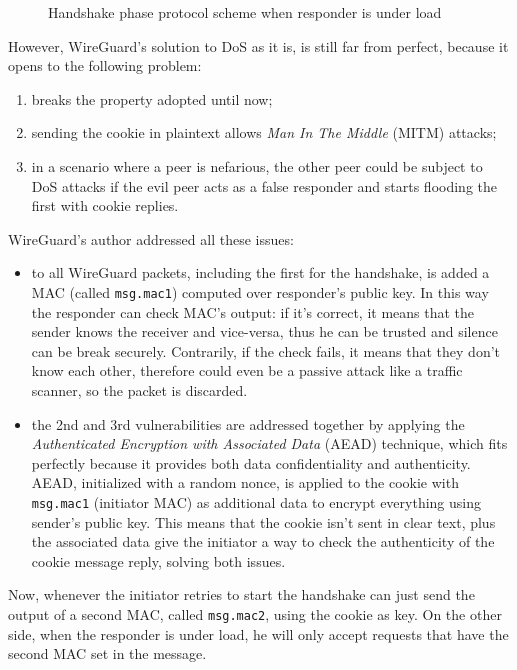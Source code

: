 \documentclass[light]{academica}
\begin{document}
\begin{figure}
  \centering
  
  \caption{Handshake phase protocol scheme when responder is under load}
  \label{fig:handshakeschemeunderload}
\end{figure}

\newpage

However, WireGuard's solution to DoS as it is, is still far from perfect, because it opens to the following problem:
\begin{enumerate}
  \item breaks the  property adopted until now;
  \item sending the cookie in plaintext allows \textit{Man In The Middle} (MITM) attacks;
  \item in a scenario where a peer is nefarious, the other peer could be subject to DoS attacks if the evil peer acts as a false responder and starts flooding the first with cookie replies.
\end{enumerate}
WireGuard's author addressed all these issues:
\begin{itemize}
  \item to all WireGuard packets, including the first for the handshake, is added a MAC (called \texttt{msg.mac1}) computed over responder's public key. In this way the responder can check MAC's output: if it's correct, it means that the sender knows the receiver and vice-versa, thus he can be trusted and silence can be break securely. Contrarily, if the check fails, it means that they don't know each other, therefore could even be a passive attack like a traffic scanner, so the packet is discarded.
  \item the 2nd and 3rd vulnerabilities are addressed together by applying the \textit{Authenticated Encryption with Associated Data} (AEAD) technique, which fits perfectly because it provides both data confidentiality and authenticity. AEAD, initialized with a random nonce, is applied to the cookie with \texttt{msg.mac1} (initiator MAC) as additional data to encrypt everything using sender's public key. This means that the cookie isn't sent in clear text, plus the associated data give the initiator a way to check the authenticity of the cookie message reply, solving both issues.
\end{itemize}
Now, whenever the initiator retries to start the handshake can just send the output of a second MAC, called \texttt{msg.mac2}, using the cookie as key.
On the other side, when the responder is under load, he will only accept requests that have the second MAC set in the message.
\end{document}
